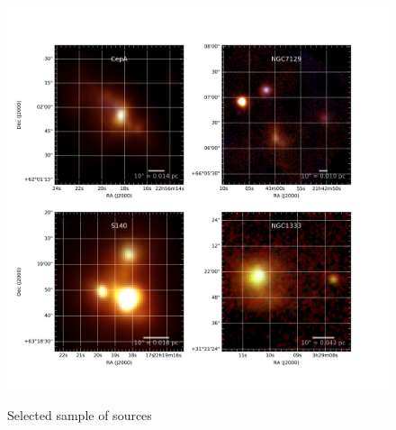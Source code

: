 \begin{figure}[!h]
\begin{center}
\includegraphics[width=\textwidth]{Figures/RGBmosaic.png}
\label{fig:variety_sources}
\vspace{-1cm}
\caption[RGB images of select sample of sources]{Selected sample of sources}
\end{center}
\end{figure}

